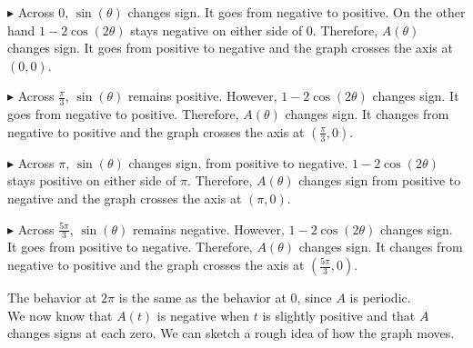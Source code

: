 \documentclass{ximera}
\begin{document}
\begin{explanation}

$\blacktriangleright$  Across $0$, $\sin(\theta)$ changes sign. It goes from negative to positive. On the other hand $1 - 2\cos(2\theta)$ stays negative on either side of $0$.  Therefore, $A(\theta)$ changes sign.  It goes from positive to negative and the graph crosses the axis at $(0, 0)$.

$\blacktriangleright$  Across $\frac{\pi}{3}$, $\sin(\theta)$ remains positive. However, $1 - 2\cos(2\theta)$ changes sign.  It goes from negative to positive. Therefore, $A(\theta)$ changes sign. It changes from negative to positive and the graph crosses the axis at $\left( \frac{\pi}{3}, 0 \right)$.


$\blacktriangleright$  Across $\pi$, $\sin(\theta)$ changes sign, from positive to negative.  $1 - 2\cos(2\theta)$ stays positive on either side of $\pi$.  Therefore, $A(\theta)$ changes sign from positive to negative and the graph crosses the axis at $(\pi, 0)$.


$\blacktriangleright$  Across $\frac{5\pi}{3}$, $\sin(\theta)$ remains negative. However, $1 - 2\cos(2\theta)$ changes sign.  It goes from positive to negative. Therefore, $A(\theta)$ changes sign. It changes from negative to positive and the graph crosses the axis at $\left( \frac{5\pi}{3}, 0 \right)$.



\end{explanation}






The behavior at $2\pi$ is the same as the behavior at $0$, since $A$ is periodic. \\





We now know that $A(t)$ is negative when $t$ is slightly positive and that $A$ changes signs at each zero. We can sketch a rough idea of how the graph moves.
\end{document}
